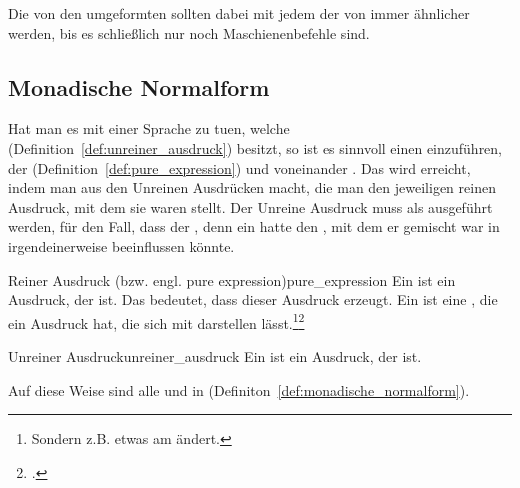 Die von den  umgeformten  sollten dabei mit jedem  der  von  immer ähnlicher werden, bis es schließlich nur noch Maschienenbefehle sind.


\subsection{Monadische Normalform}

Hat man es mit einer Sprache zu tuen, welche  (Definition~\ref{def:unreiner_ausdruck}) besitzt, so ist es sinnvoll einen  einzuführen, der  (Definition~\ref{def:pure_expression}) und  voneinander . Das wird erreicht, indem man aus den Unreinen Ausdrücken  macht, die man  den jeweiligen reinen Ausdruck, mit dem sie  waren stellt. Der Unreine Ausdruck muss als  ausgeführt werden, für den Fall, dass der , denn ein  hatte den , mit dem er gemischt war in irgendeinerweise beeinflussen könnte.


\begin{Definition}{Reiner Ausdruck (bzw. engl. pure expression)}{pure_expression}
  Ein  ist ein Ausdruck, der  ist. Das bedeutet, dass dieser Ausdruck  erzeugt. Ein  ist eine , die ein Ausdruck hat, die sich  mit  darstellen lässt.\footnote{Sondern z.B.  etwas am  ändert.}\footcite{g_siek_course_2022}
\end{Definition}

\begin{Definition}{Unreiner Ausdruck}{unreiner_ausdruck}
  Ein  ist ein Ausdruck, der  ist.
\end{Definition}

Auf diese Weise sind alle  und  in  (Definiton~\ref{def:monadische_normalform}).

